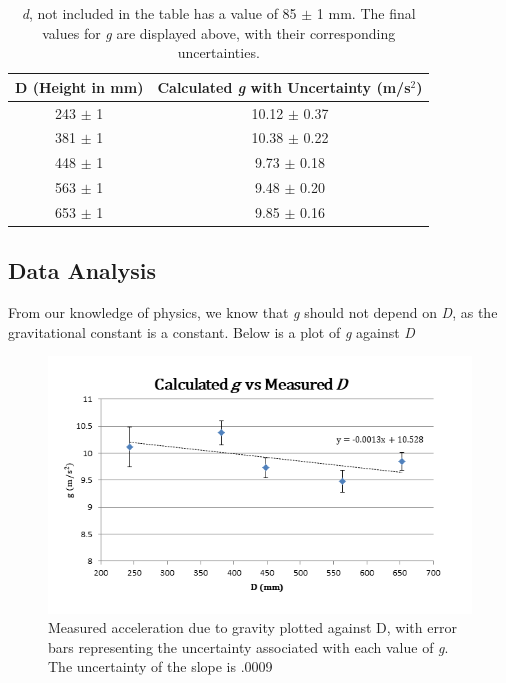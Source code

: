 \documentclass[titlepage]{article}
\begin{document}
\begin{table}[!htbp]
\renewcommand{\arraystretch}{1.3}
\centering
\begin{tabular}{c|c}
    \hline
    \hline
    D (Height in mm) & Calculated \textit{g} with Uncertainty (m/s$^2$)\\
    \hline
    \hline

    243 $\pm$ 1    &  10.12 $\pm$ 0.37 \\
    \hline

    381 $\pm$ 1    &  10.38 $\pm$ 0.22 \\
    \hline

    448 $\pm$ 1   &   9.73 $\pm$ 0.18\\
    \hline

    563 $\pm$ 1   &  9.48 $\pm$ 0.20\\
    \hline

    653 $\pm$ 1  &  9.85 $\pm$ 0.16\\
    \hline
\end{tabular}
\caption{\textit{d}, not included in the table has a value of 85 $\pm$ 1 mm. The final values for \textit{g} are displayed above, with their corresponding uncertainties.}
\end{table}

\pagebreak

\subsection{Data Analysis}

From our knowledge of physics, we know that \textit{g} should not depend on \textit{D}, as the gravitational constant is a constant. Below is a plot of \textit{g} against \textit{D}

\begin{figure}[!htbp]
    \centering
    \includegraphics[width=5.0in]{Chart.png}
    \caption{Measured acceleration due to gravity plotted against D, with error bars representing the uncertainty associated with each value of \textit{g}. The uncertainty of the slope is .0009}
\end{figure}
\end{document}
